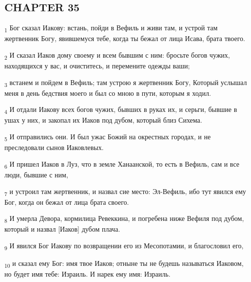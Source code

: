 \subsection{CHAPTER 35}
\begin{tcolorbox}
\textsubscript{1} Бог сказал Иакову: встань, пойди в Вефиль и живи там, и устрой там жертвенник Богу, явившемуся тебе, когда ты бежал от лица Исава, брата твоего.
\end{tcolorbox}
\begin{tcolorbox}
\textsubscript{2} И сказал Иаков дому своему и всем бывшим с ним: бросьте богов чужих, находящихся у вас, и очиститесь, и перемените одежды ваши;
\end{tcolorbox}
\begin{tcolorbox}
\textsubscript{3} встанем и пойдем в Вефиль; там устрою я жертвенник Богу, Который услышал меня в день бедствия моего и был со мною в пути, которым я ходил.
\end{tcolorbox}
\begin{tcolorbox}
\textsubscript{4} И отдали Иакову всех богов чужих, бывших в руках их, и серьги, бывшие в ушах у них, и закопал их Иаков под дубом, который близ Сихема.
\end{tcolorbox}
\begin{tcolorbox}
\textsubscript{5} И отправились они. И был ужас Божий на окрестных городах, и не преследовали сынов Иаковлевых.
\end{tcolorbox}
\begin{tcolorbox}
\textsubscript{6} И пришел Иаков в Луз, что в земле Ханаанской, то есть в Вефиль, сам и все люди, бывшие с ним,
\end{tcolorbox}
\begin{tcolorbox}
\textsubscript{7} и устроил там жертвенник, и назвал сие место: Эл-Вефиль, ибо тут явился ему Бог, когда он бежал от лица брата своего.
\end{tcolorbox}
\begin{tcolorbox}
\textsubscript{8} И умерла Девора, кормилица Ревеккина, и погребена ниже Вефиля под дубом, который и назвал [Иаков] дубом плача.
\end{tcolorbox}
\begin{tcolorbox}
\textsubscript{9} И явился Бог Иакову по возвращении его из Месопотамии, и благословил его,
\end{tcolorbox}
\begin{tcolorbox}
\textsubscript{10} и сказал ему Бог: имя твое Иаков; отныне ты не будешь называться Иаковом, но будет имя тебе: Израиль. И нарек ему имя: Израиль.
\end{tcolorbox}
